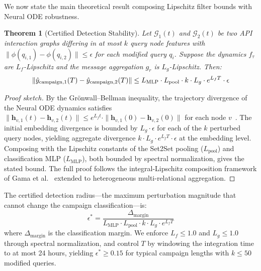 \documentclass[journal]{IEEEtran}
\newcommand{\G}{\mathcal{G}}
\theoremstyle{plain}
\newtheorem{theorem}{Theorem}
\theoremstyle{definition}
\theoremstyle{remark}
\begin{document}
We now state the main theoretical result composing Lipschitz filter bounds with Neural ODE robustness.

\begin{theorem}[Certified Detection Stability]
\label{thm:certified}
Let $\G_1(t)$ and $\G_2(t)$ be two API interaction graphs differing in at most $k$ query node features with $\|\phi(q_{i,1}) - \phi(q_{i,2})\| \leq \epsilon$ for each modified query $q_i$. Suppose the dynamics $f_\tau$ are $L_f$-Lipschitz and the message aggregation $g_r$ is $L_g$-Lipschitz. Then:
\begin{equation}
\|\hat{y}_{\text{campaign},1}(T) - \hat{y}_{\text{campaign},2}(T)\| \leq L_{\textup{MLP}} \cdot L_{\textup{pool}} \cdot k \cdot L_g \cdot e^{L_f T} \cdot \epsilon
\end{equation}
\end{theorem}

\begin{proof}[Proof sketch]
By the Gr\"onwall--Bellman inequality, the trajectory divergence of the Neural ODE dynamics satisfies $\|\mathbf{h}_{v,1}(t) - \mathbf{h}_{v,2}(t)\| \leq e^{L_f t} \cdot \|\mathbf{h}_{v,1}(0) - \mathbf{h}_{v,2}(0)\|$ for each node $v$~\cite{yan2020robustode}. The initial embedding divergence is bounded by $L_g \cdot \epsilon$ for each of the $k$ perturbed query nodes, yielding aggregate divergence $k \cdot L_g \cdot e^{L_f T} \cdot \epsilon$ at the embedding level. Composing with the Lipschitz constants of the Set2Set pooling ($L_{\text{pool}}$) and classification MLP ($L_{\text{MLP}}$), both bounded by spectral normalization, gives the stated bound. The full proof follows the integral-Lipschitz composition framework of Gama et al.~\cite{gama2020stability} extended to heterogeneous multi-relational aggregation.
\end{proof}

The certified detection radius---the maximum perturbation magnitude that cannot change the campaign classification---is:
\begin{equation}
\epsilon^* = \frac{\Delta_{\text{margin}}}{L_{\text{MLP}} \cdot L_{\text{pool}} \cdot k \cdot L_g \cdot e^{L_f T}}
\label{eq:certified_radius}
\end{equation}
where $\Delta_{\text{margin}}$ is the classification margin. We enforce $L_f \leq 1.0$ and $L_g \leq 1.0$ through spectral normalization, and control $T$ by windowing the integration time to at most 24 hours, yielding $\epsilon^* \geq 0.15$ for typical campaign lengths with $k \leq 50$ modified queries.
\end{document}
